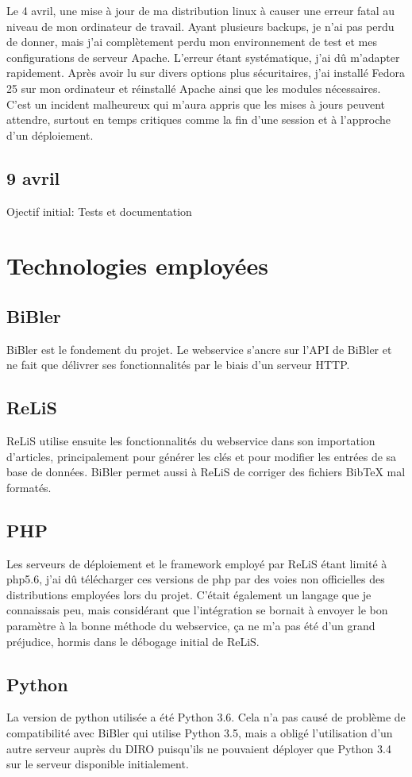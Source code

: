 \documentclass[a4paper,12pt,titlepage]{article}
\begin{document}
Le 4 avril, une mise à jour de ma distribution linux à causer une erreur fatal au niveau de mon ordinateur de travail. Ayant plusieurs backups, je n'ai pas perdu de donner, mais j'ai complètement perdu mon environnement de test et mes configurations de serveur Apache. L'erreur étant systématique, j'ai dû m'adapter rapidement. Après avoir lu sur divers options plus sécuritaires, j'ai installé Fedora 25 sur mon ordinateur et réinstallé Apache ainsi que les modules nécessaires. C'est un incident malheureux qui m'aura appris que les mises à jours peuvent attendre, surtout en temps critiques comme la fin d'une session et à l'approche d'un déploiement.

\subsection{9 avril}
Ojectif initial: Tests et documentation \newline

\section{Technologies employées}
\subsection{BiBler}
BiBler est le fondement du projet. Le webservice s'ancre sur l'API de BiBler et ne fait que délivrer ses fonctionnalités par le biais d'un serveur HTTP. 
\subsection{ReLiS}
ReLiS utilise ensuite les fonctionnalités du webservice dans son importation d'articles, principalement pour générer les clés et pour modifier les entrées de sa base de données. BiBler permet aussi à ReLiS de corriger des fichiers BibTeX mal formatés.
\subsection{PHP}
Les serveurs de déploiement et le framework employé par ReLiS étant limité à php5.6, j'ai dû télécharger ces versions de php par des voies non officielles des distributions employées lors du projet. C'était également un langage que je connaissais peu, mais considérant que l'intégration se bornait à envoyer le bon paramètre à la bonne méthode du webservice, ça ne m'a pas été d'un grand préjudice, hormis dans le débogage initial de ReLiS.
\subsection{Python}
La version de python utilisée a été Python 3.6. Cela n'a pas causé de problème de compatibilité avec BiBler qui utilise Python 3.5, mais a obligé l'utilisation d'un autre serveur auprès du DIRO puisqu'ils ne pouvaient déployer que Python 3.4 sur le serveur disponible initialement. \newline
\end{document}
